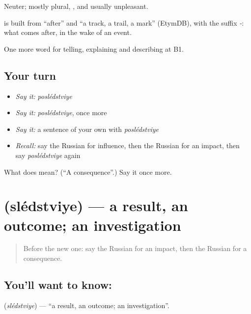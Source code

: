 Neuter; mostly plural, \emph{}, and usually unpleasant.

\begin{cousinweb}
\textbf{} is built from \emph{} \textquotedblleft{}after\textquotedblright{} and \emph{} \textquotedblleft{}a track, a trail, a mark\textquotedblright{} (EtymDB), with the suffix \emph{-}: what comes after, in the wake of an event.
\end{cousinweb}

\begin{grammarlens}[title={What you've built}]
One more word for telling, explaining and describing at B1.
\end{grammarlens}

\subsection*{Your turn}
\begin{itemize}
\raggedright
  \item \emph{Say it:} \emph{poslédstviye}
  \item \emph{Say it:} \emph{poslédstviye}, once more
  \item \emph{Say it:} a sentence of your own with \emph{poslédstviye}
  \item \emph{Recall:} say the Russian for influence, then the Russian for an impact, then say \emph{poslédstviye} again
\end{itemize}

\begin{tcolorbox}[breakable,colback=teal!4,colframe=teal!35!black,title={Before you move on}]
What does  mean? (\textquotedblleft{}A consequence\textquotedblright{}.) Say it once more.
\end{tcolorbox}
\section[\texorpdfstring{\ru{следствие} (slédstviye)}{следствие (slédstviye)}]{ (slédstviye) — a result, an outcome; an investigation}

\label{lesson:RU-C350-sledstvie}



\begin{quote}
Before the new one: say the Russian for an impact, then the Russian for a consequence.
\end{quote}

\subsection*{You'll want to know: }
\textbf{} (\emph{slédstviye}) — \textquotedblleft{}a result, an outcome; an investigation\textquotedblright{}.

